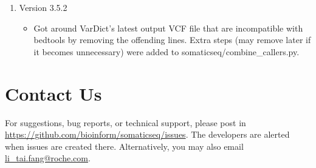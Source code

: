 \documentclass[10pt,letterpaper]{article}
\begin{document}
\begin{sloppypar}
\begin{enumerate}
\begin{itemize}
		\end{itemize}

		
	\item Version 3.5.2

        \begin{itemize}
            \item Got around VarDict's latest output VCF file that are incompatible with bedtools by removing the offending lines. Extra steps (may remove later if it becomes unnecessary) were added to somaticseq/combine\_callers.py.
		\end{itemize}
		
		
\end{enumerate}




\section{Contact Us}
For suggestions, bug reports, or technical support, please post in \href{https://github.com/bioinform/somaticseq/issues}{https://github.com/bioinform/somaticseq/issues}. The developers are alerted when issues are created there. Alternatively, you may also email \href{mailto:li_tai.fang@roche.com}{li\_tai.fang@roche.com}. 












\end{sloppypar}
\end{document}
